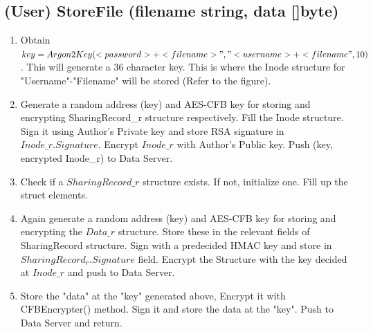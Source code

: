 \documentclass[a4paper, 12pt]{scrartcl}
\begin{document}
\subsection{(User) StoreFile (filename string, data []byte)}
\begin{enumerate}
	\itemsep0em
	\item Obtain $key = Argon2Key(<password>+<filename>", "<username>+<filename", 10)$. This will generate a 36 character key. This is where the Inode structure for "Username"-"Filename" will be stored (Refer to the figure).
	\item Generate a random address (key) and AES-CFB key for storing and encrypting SharingRecord\_r structure respectively. Fill the Inode structure. Sign it using Author's Private key and store RSA signature in $Inode\_r.Signature$. Encrypt $Inode\_r$ with Author's Public key. Push (key, encrypted Inode\_r) to Data Server.
	\item Check if a $SharingRecord\_r$ structure exists. If not, initialize one. Fill up the struct elements.
	\item Again generate a random address (key) and AES-CFB key for storing and encrypting the $Data\_r$ structure. Store these in the relevant fields of SharingRecord structure. Sign with a predecided HMAC key and store in $SharingRecord_r.Signature$ field. Encrypt the Structure with the key decided at $Inode\_r$ and push to Data Server.
	\item Store the "data" at the "key" generated above, Encrypt it with CFBEncrypter() method. Sign it and store the data at the "key". Push to Data Server and return. 
\end{enumerate}
\end{document}
